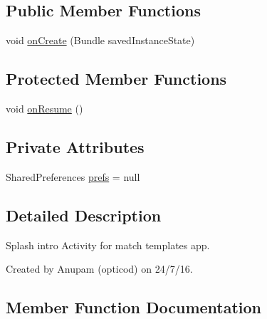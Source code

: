 \subsection*{Public Member Functions}
\begin{DoxyCompactItemize}
\item 
void \hyperlink{classorg_1_1buildmlearn_1_1matchtemplate_1_1activities_1_1SplashActivity_a27c096b1ffb2f5449f6e1e7a100b7944}{on\+Create} (Bundle saved\+Instance\+State)
\end{DoxyCompactItemize}
\subsection*{Protected Member Functions}
\begin{DoxyCompactItemize}
\item 
void \hyperlink{classorg_1_1buildmlearn_1_1matchtemplate_1_1activities_1_1SplashActivity_ab194f447b8fda1c68b377ad4d8960ef1}{on\+Resume} ()
\end{DoxyCompactItemize}
\subsection*{Private Attributes}
\begin{DoxyCompactItemize}
\item 
Shared\+Preferences \hyperlink{classorg_1_1buildmlearn_1_1matchtemplate_1_1activities_1_1SplashActivity_a1a0e7fb43af75891f17f7b4179b186de}{prefs} = null
\end{DoxyCompactItemize}


\subsection{Detailed Description}
Splash intro Activity for match template\textquotesingle{}s app. 

Created by Anupam (opticod) on 24/7/16. 

\subsection{Member Function Documentation}
